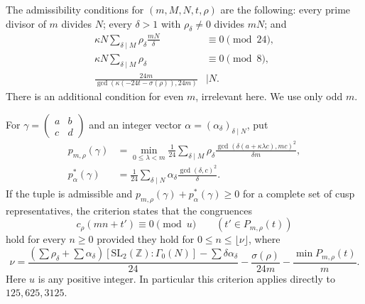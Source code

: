 \documentclass[11pt]{article}
\newcommand{\Z}{\mathbb Z}
\newcommand{\dd}{\delta}
\begin{document}
The admissibility conditions for $(m,M,N,t,\rho)$ are the following: every prime divisor of $m$ divides $N$; every $\dd>1$ with $\rho_\dd\ne0$ divides $mN$; and
\begin{align*}
 \kappa N\sum_{\dd\mid M}\rho_\dd\frac{mN}{\dd}&\equiv0\pmod{24},\\
 \kappa N\sum_{\dd\mid M}\rho_\dd&\equiv0\pmod8,\\
 \frac{24m}{\gcd(\kappa(-24t-\sigma(\rho)),24m)}&\mid N.
\end{align*}
There is an additional condition for even $m$, irrelevant here. We use only odd $m$.

For $\gamma=\left(\begin{smallmatrix}a&b\\c&d\end{smallmatrix}\right)$ and an integer vector $\alpha=(\alpha_\dd)_{\dd\mid N}$, put
\begin{align*}
 p_{m,\rho}(\gamma)&=\min_{0\le\lambda<m}\frac1{24}
 \sum_{\dd\mid M}\rho_\dd\frac{\gcd(\dd(a+\kappa\lambda c),mc)^2}{\dd m},\\
 p^*_{\alpha}(\gamma)&=\frac1{24}\sum_{\dd\mid N}\alpha_\dd\frac{\gcd(\dd,c)^2}{\dd}.
\end{align*}
If the tuple is admissible and $p_{m,\rho}(\gamma)+p^*_{\alpha}(\gamma)\ge0$ for a complete set of cusp representatives, the criterion states that the congruences
\[
 c_\rho(mn+t')\equiv0\pmod u\qquad(t'\in P_{m,\rho}(t))
\]
hold for every $n\ge0$ provided they hold for $0\le n\le\lfloor\nu\rfloor$, where
\begin{equation}\label{eq:nu}
 \nu=\frac{(\sum\rho_\dd+\sum\alpha_\dd)[\mathrm{SL}_2(\Z):\Gamma_0(N)]
 -\sum\dd\alpha_\dd}{24}
 -\frac{\sigma(\rho)}{24m}-\frac{\min P_{m,\rho}(t)}m.
\end{equation}
Here $u$ is any positive integer. In particular this criterion applies directly to $125,625,3125$.
\end{document}
